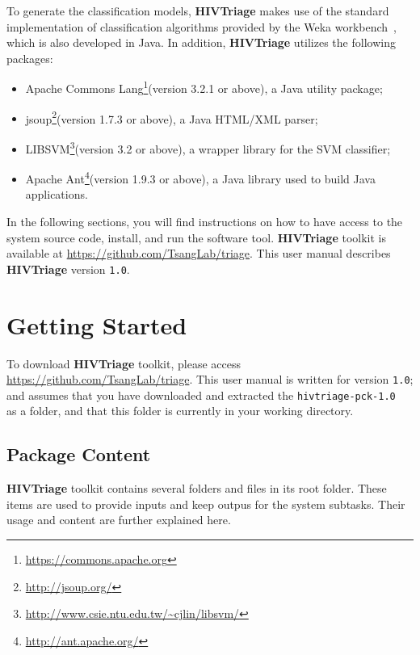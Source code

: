\documentclass[11pt]{article}
\newcommand{\system}{{\bf{HIVTriage}}}
\newcommand{\homefolder}{\texttt{hivtriage-pck-\version{ }}}
\def\version{{\tt 1.0}}
\begin{document}
To generate the classification models, \system{} makes use of the standard implementation 
of classification algorithms provided by the Weka workbench~\cite{hall2009weka}, 
which is also developed in Java.
In addition, \system{} utilizes the following packages:
\begin{itemize}
 \item Apache Commons Lang\footnote{\url{https://commons.apache.org}}(version 3.2.1 or above), a Java utility package;
 \item jsoup\footnote{\url{http://jsoup.org/}}(version 1.7.3 or above), a Java HTML/XML parser;
 \item LIBSVM\footnote{\url{http://www.csie.ntu.edu.tw/~cjlin/libsvm/}}(version 3.2 or above), a wrapper library for the SVM classifier;
 \item Apache Ant\footnote{\url{http://ant.apache.org/}}(version 1.9.3 or above), a Java library used to build Java applications.
\end{itemize}

In the following sections, you will find instructions on how to 
have access to the system source code, install, and run the software tool.
\system{} toolkit is available at \url{https://github.com/TsangLab/triage}.
This user manual describes \system{} version {\version}. 

\section{Getting Started}
\label{sec:start}
To download \system{} toolkit, please access \url{https://github.com/TsangLab/triage}. 
This user manual is written for version \version; 
and assumes that you have downloaded and extracted the \homefolder{} as a folder, 
and that this folder is currently in your working directory.

\subsection{Package Content}
\label{subsec:pckcontent}
\system{} toolkit contains several folders and files in its root folder.
These items are used to provide inputs and keep outpus for the system subtasks. 
Their usage and content are further explained here. 
\end{document}
